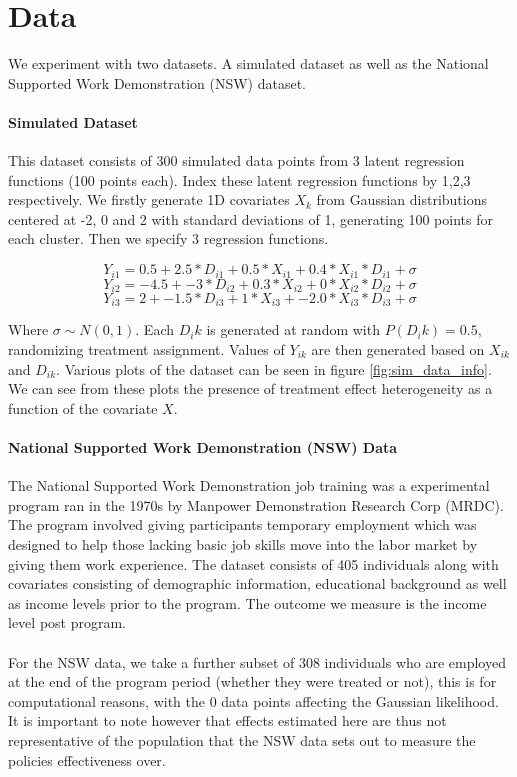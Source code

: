 \documentclass{article}
\begin{document}
\section{Data}
We experiment with two datasets. A simulated dataset as well as the National Supported Work Demonstration (NSW) dataset.

\paragraph{Simulated Dataset} This dataset consists of 300 simulated data points from 3 latent regression functions (100 points each). Index these latent regression functions by 1,2,3 respectively. We firstly generate 1D covariates $X_k$ from Gaussian distributions centered at -2, 0 and 2 with standard deviations of 1, generating 100 points for each cluster. Then we specify 3 regression functions.

\begin{equation}
\label{eqn:latent_reg1}
Y_{i1} = 0.5 + 2.5 * D_{i1} + 0.5*X_{i1} + 0.4*X_{i1}*D_{i1} + \sigma
\end{equation}
\begin{equation}
\label{eqn:latent_reg1}
Y_{i2} = -4.5 + -3 * D_{i2} + 0.3*X_{i2} + 0*X_{i2}*D_{i2} + \sigma
\end{equation}
\begin{equation}
\label{eqn:latent_reg1}
Y_{i3} = 2 + -1.5 * D_{i3} + 1*X_{i3} + -2.0*X_{i3}*D_{i3} + \sigma
\end{equation}

Where $\sigma \sim N(0,1)$. Each $D_ik$ is generated at random with $P(D_ik) = 0.5$, randomizing treatment assignment. Values of $Y_{ik}$ are then generated based on $X_{ik}$ and $D_{ik}$. Various plots of the dataset can be seen in figure \ref{fig:sim_data_info}. We can see from these plots the presence of treatment effect heterogeneity as a function of the covariate $X$. 

\paragraph{National Supported Work Demonstration (NSW) Data} The National Supported Work Demonstration job training was a experimental program ran in the 1970s by Manpower Demonstration Research Corp (MRDC). The program involved giving participants temporary employment which was designed to help those lacking basic job skills move into the labor market by giving them work experience. The dataset consists of 405 individuals along with covariates consisting of demographic information, educational background as well as income levels prior to the program. The outcome we measure is the income level post program. 
\\ \\ 
For the NSW data, we take a further subset of 308 individuals who are employed at the end of the program period (whether they were treated or not), this is for computational reasons, with the 0 data points affecting the Gaussian likelihood. It is important to note however that effects estimated here are thus not representative of the population that the NSW data sets out to measure the policies effectiveness over.
\end{document}
